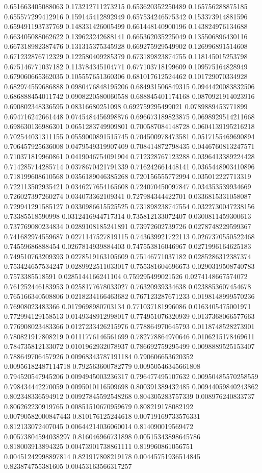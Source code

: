 \begin{table}
\begin{tabu}
\begin{sparkline}{10}
0.651663405088063 0.173212711273215 0.653620352250489 0.165756288875185 0.655577299412916 0.159145412892949 0.657534246575342 0.153373914881596 0.659491193737769 0.148331426005499 0.661448140900196 0.143824976134688 0.663405088062622 0.139623242688141 0.665362035225049 0.135506896430116 0.667318982387476 0.131315375345928 0.669275929549902 0.126996891514608 0.671232876712329 0.122580409285379 0.673189823874755 0.118145015253798 0.675146771037182 0.113784345104771 0.677103718199609 0.109575164828949 0.679060665362035 0.105557651360306 0.681017612524462 0.101729070334928 0.682974559686888 0.0980476848195206 0.684931506849315 0.0944420083832506 0.686888454011742 0.0908220580060558 0.688845401174168 0.0870921914023916 0.690802348336595 0.08316680251098 0.692759295499021 0.0789889453771899 0.694716242661448 0.0745484456998876 0.696673189823875 0.0698929514211668 0.698630136986301 0.0651283749909801 0.700587084148728 0.0604139195216218 0.702544031311155 0.0559000891515745 0.704500978473581 0.0517155469690894 0.706457925636008 0.0479549319907409 0.708414872798435 0.0446760813247571 0.710371819960861 0.0419046754091904 0.712328767123288 0.0396413389224428 0.714285714285714 0.0378670421791339 0.716242661448141 0.0365448903410896 0.718199608610568 0.0356189046385268 0.720156555772994 0.035012227713319 0.722113502935421 0.0346277654165608 0.724070450097847 0.034353539934669 0.726027397260274 0.034073362109341 0.727984344422701 0.0336815331058087 0.729941291585127 0.0330986615525525 0.731898238747554 0.0322730047238156 0.73385518590998 0.0312416944717314 0.735812133072407 0.0300811459300613 0.737769080234834 0.0289108185241891 0.73972602739726 0.0278748229599367 0.741682974559687 0.0271147527819115 0.743639921722113 0.0267370550522468 0.74559686888454 0.0267814939884403 0.747553816046967 0.0271996164625183 0.749510763209393 0.0278519163105609 0.75146771037182 0.0285286312387374 0.753424657534247 0.0289922511033017 0.755381604696673 0.0290319508740783 0.7573385518591 0.0285144166241104 0.759295499021526 0.0274148667574072 0.761252446183953 0.0258177678033027 0.76320939334638 0.0238853607454678 0.765166340508806 0.0218234166463682 0.767123287671233 0.0198148999570236 0.76908023483366 0.0179698980703134 0.771037181996086 0.0163405475001971 0.772994129158513 0.0149348912998017 0.774951076320939 0.0137368066577663 0.776908023483366 0.0127233426215976 0.778864970645793 0.0118748528273901 0.780821917808219 0.0111776146561699 0.782778864970646 0.0106215178469611 0.784735812133072 0.0101962932078937 0.786692759295499 0.0098889525153407 0.788649706457926 0.00968343787191184 0.790606653620352 0.00956182487114718 0.792563600782779 0.00950546345661808 0.794520547945206 0.0094945003236317 0.796477495107632 0.00950485570258559 0.798434442270059 0.0095010116509698 0.800391389432485 0.00944059840243862 0.802348336594912 0.00927845592548268 0.804305283757339 0.008976240833737 0.806262230919765 0.00851510670959679 0.808219178082192 0.00790582000847443 0.810176125244618 0.00719169733576331 0.812133072407045 0.00644214036060014 0.814090019569472 0.00573804594038297 0.816046966731898 0.00515343898645786 0.818003913894325 0.00473901738861111 0.819960861056751 0.00451242998897814 0.821917808219178 0.00445751936514845 0.823874755381605 0.00453163566317257 
\end{sparkline}
\end{tabu}
\end{table}
